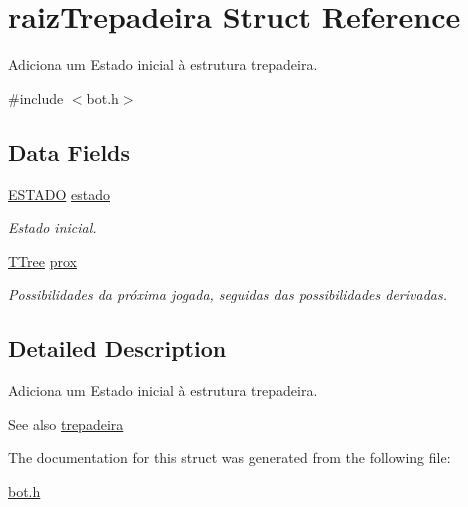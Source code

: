 \hypertarget{structraiz_trepadeira}{}\section{raiz\+Trepadeira Struct Reference}
\label{structraiz_trepadeira}


Adiciona um Estado inicial à estrutura \textquotesingle{}trepadeira\textquotesingle{}.  




{\ttfamily \#include $<$bot.\+h$>$}

\subsection*{Data Fields}
\begin{DoxyCompactItemize}
\item 
\mbox{\label{structraiz_trepadeira_ab6f246f52bd4a806e3b6a0ebb6b2b8bb}} 
\hyperlink{estado_8h_a857f2529d823a22e6f4a81cf21fb810f}{E\+S\+T\+A\+DO} \hyperlink{structraiz_trepadeira_ab6f246f52bd4a806e3b6a0ebb6b2b8bb}{estado}
\begin{DoxyCompactList}\small\item\em Estado inicial. \end{DoxyCompactList}\item 
\mbox{\label{structraiz_trepadeira_af2903e8f527c208a105df49e7c800d4b}} 
\hyperlink{bot_8h_aae2ffd32242a51942985cb9ba7d8f6fa}{T\+Tree} \hyperlink{structraiz_trepadeira_af2903e8f527c208a105df49e7c800d4b}{prox}
\begin{DoxyCompactList}\small\item\em Possibilidades da próxima jogada, seguidas das possibilidades derivadas. \end{DoxyCompactList}\end{DoxyCompactItemize}


\subsection{Detailed Description}
Adiciona um Estado inicial à estrutura \textquotesingle{}trepadeira\textquotesingle{}. 

\begin{DoxySeeAlso}{See also}
\hyperlink{structtrepadeira}{trepadeira} 
\end{DoxySeeAlso}


The documentation for this struct was generated from the following file\+:\begin{DoxyCompactItemize}
\item 
\hyperlink{bot_8h}{bot.\+h}\end{DoxyCompactItemize}
